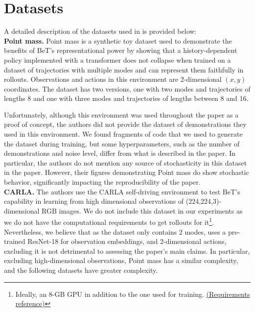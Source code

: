 \section{Datasets}\label{app:datasets}

A detailed description of the datasets used in \citet{shafiullah2022behavior} is provided below:\\

\textbf{Point mass.}
Point mass is a synthetic toy dataset used to demonstrate the benefits of BeT's representational power by showing that a history-dependent policy implemented with a transformer does not collapse when trained on a dataset of trajectories with multiple modes and can represent them faithfully in rollouts.
Observations and actions in this environment are 2-dimensional $(x,y)$ coordinates.
The dataset has two versions, one with two modes and trajectories of lengths 8 and one with three modes and trajectories of lengths between 8 and 16.

Unfortunately, although this environment was used throughout the paper as a proof of concept, the authors did not provide the dataset of demonstrations they used in this environment.
We found fragments of code that we used to generate the dataset during training, but some hyperparameters, such as the number of demonstrations and noise level, differ from what is described in the paper.
In particular, the authors do not mention any source of stochasticity in this dataset in the paper.
However, their figures demonstrating Point mass do show stochastic behavior, significantly impacting the reproducibility of the paper.\\

\textbf{CARLA.}
The authors use the CARLA self-driving environment \cite{dosovitskiy_carla_2017} to test BeT's capability in learning from high dimensional observations of (224,224,3)-dimensional RGB images.
We do not include this dataset in our experiments as we do not have the computational requirements to get rollouts for it\footnote{Ideally, an 8-GB GPU in addition to the one used for training. \href{https://carla.readthedocs.io/en/latest/start_quickstart/}{(Requirements reference)}}.
Nevertheless, we believe that as the dataset only contains 2 modes, uses a pre-trained ResNet-18 for observation embeddings, and 2-dimensional actions, excluding it is not detrimental to assessing the paper's main claims.
In particular, excluding high-dimensional observations, Point mass has a similar complexity, and the following datasets have greater complexity.\\

